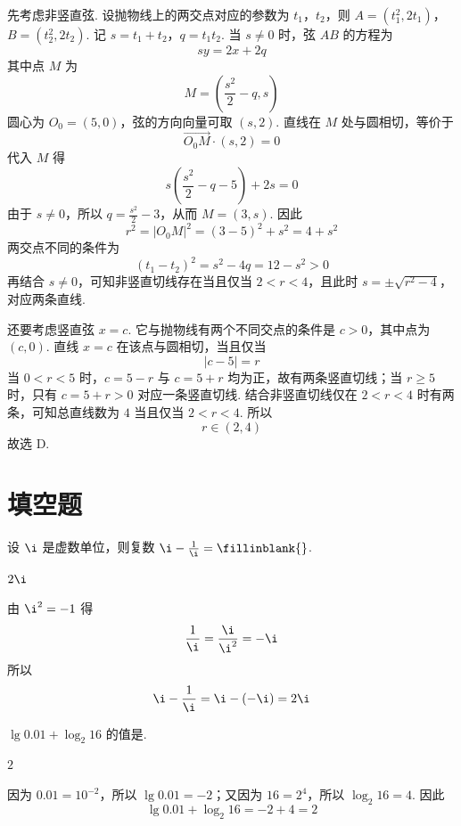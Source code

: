 \begin{solution}
先考虑非竖直弦. 设抛物线上的两交点对应的参数为 \(t_1\)，\(t_2\)，则
\(A=(t_1^2,2t_1)\)，\(B=(t_2^2,2t_2)\).
记 \(s=t_1+t_2\)，\(q=t_1t_2\). 当 \(s\neq0\) 时，弦 \(AB\) 的方程为
\[
sy=2x+2q
\]
其中点 \(M\) 为
\[
M=\left(\frac{s^2}{2}-q,s\right)
\]
圆心为 \(O_0=(5,0)\)，弦的方向向量可取 \((s,2)\). 直线在 \(M\) 处与圆相切，等价于
\[
\overrightarrow{O_0M}\cdot(s,2)=0
\]
代入 \(M\) 得
\[
s\left(\frac{s^2}{2}-q-5\right)+2s=0
\]
由于 \(s\neq0\)，所以 \(q=\frac{s^2}{2}-3\)，从而 \(M=(3,s)\). 因此
\[
r^2=|O_0M|^2=(3-5)^2+s^2=4+s^2
\]
两交点不同的条件为
\[
(t_1-t_2)^2=s^2-4q=12-s^2>0
\]
再结合 \(s\neq0\)，可知非竖直切线存在当且仅当 \(2<r<4\)，且此时 \(s=\pm\sqrt{r^2-4}\)，对应两条直线.

还要考虑竖直弦 \(x=c\). 它与抛物线有两个不同交点的条件是 \(c>0\)，其中点为 \((c,0)\). 直线 \(x=c\) 在该点与圆相切，当且仅当
\[
|c-5|=r
\]
当 \(0<r<5\) 时，\(c=5-r\) 与 \(c=5+r\) 均为正，故有两条竖直切线；当 \(r\geqslant5\) 时，只有 \(c=5+r>0\) 对应一条竖直切线. 结合非竖直切线仅在 \(2<r<4\) 时有两条，可知总直线数为 \(4\) 当且仅当 \(2<r<4\). 所以
\[
r\in(2,4)
\]
故选 D.
\end{solution}

\section{填空题}

\begin{problem}
设 \(\i\) 是虚数单位，则复数 \(\i - \frac{1}{\i} =\fillinblank{}\).
\end{problem}

\begin{answer}
\(2\i\)
\end{answer}

\begin{solution}
由 \(\i^2=-1\) 得
\[
\frac{1}{\i}=\frac{\i}{\i^2}=-\i
\]
所以
\[
\i-\frac{1}{\i}=\i-(-\i)=2\i
\]
\end{solution}

\begin{problem}
\(\lg 0.01 + \log_2 16\) 的值是\fillinblank{}.
\end{problem}

\begin{answer}
\(2\)
\end{answer}

\begin{solution}
因为 \(0.01=10^{-2}\)，所以 \(\lg0.01=-2\)；又因为 \(16=2^4\)，所以 \(\log_2 16=4\). 因此
\[
\lg0.01+\log_2 16=-2+4=2
\]
\end{solution}

